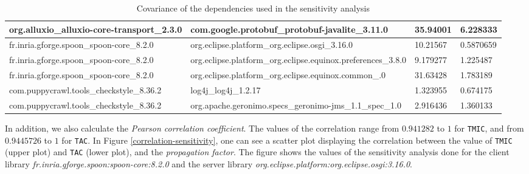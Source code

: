 \begin{table}[ht!]
\begin{center}
\begin{tabularx}{\textwidth}{|X|X|l|l|}
org.alluxio\_alluxio-core-transport\_2.3.0 & com.google.protobuf\_\newline protobuf-javalite\_3.11.0 & 35.94001 & 6.228333 \\ \hline
fr.inria.gforge.spoon\_\newline spoon-core\_8.2.0 & org.eclipse.platform\_org.\newline eclipse.osgi\_3.16.0 & 10.21567 & 0.5870659 \\ \hline
fr.inria.gforge.spoon\_\newline spoon-core\_8.2.0 & org.eclipse.platform\_org.\newline eclipse.equinox.\newline preferences\_3.8.0 & 9.179277 & 1.225487 \\ \hline
fr.inria.gforge.spoon\_\newline spoon-core\_8.2.0 & org.eclipse.platform\_org.\newline eclipse.equinox.common\_\newline3.13.0 & 31.63428 & 1.783189 \\ \hline
com.puppycrawl.tools\_\newline checkstyle\_8.36.2 & log4j\_log4j\_1.2.17 & 1.323955 & 0.674175 \\ \hline
com.puppycrawl.tools\_\newline checkstyle\_8.36.2 & org.apache.geronimo.\newline specs\_geronimo-jms\_1.1\_spec\_1.0 & 2.916436 & 1.360133 \\ \hline
\end{tabularx}
\end{center}
\caption{Covariance of the dependencies used in the sensitivity analysis}
\label{table:covariance-sensitivity}
\end{table}

In addition, we also calculate the \textit{Pearson correlation coefficient}. The values of the correlation range from $0.941282$ to $1$ for \texttt{TMIC}, and from $0.9445726
$ to $1$ for \texttt{TAC}. In Figure \ref{correlation-sensitivity}, one can see a scatter plot displaying the correlation between the value of \texttt{TMIC} (upper plot) and \texttt{TAC} (lower plot), and the \textit{propagation factor}. The figure shows the values of the sensitivity analysis done for the client library \textit{fr.inria.gforge.spoon:spoon-core:8.2.0} and the server library \textit{org.eclipse.platform:org.eclipse.osgi:3.16.0}.

